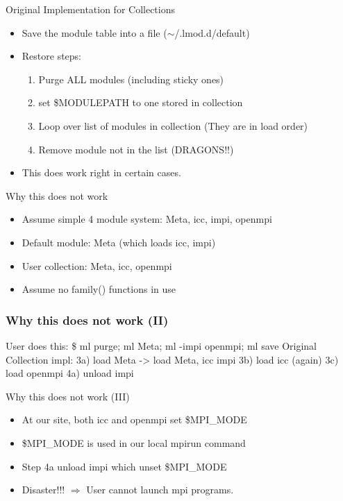 \documentclass{beamer}
\begin{document}
\begin{frame}{Original Implementation for Collections}
  \begin{itemize}
    \item Save the module table into a file ($\sim$/.lmod.d/default)
    \item Restore steps:
      \begin{enumerate}
        \item Purge ALL modules (including sticky ones)
        \item set \$MODULEPATH to one stored in collection
        \item Loop over list of modules in collection (They are in
          load order)
        \item Remove module not in the list {\color{red} (DRAGONS!!)}
      \end{enumerate}
    \item This does work right in certain cases.
  \end{itemize}
\end{frame}

\begin{frame}{Why this does not work}
  \begin{itemize}
    \item Assume simple 4 module system: Meta, icc, impi, openmpi
    \item Default module: Meta (which loads icc, impi)
    \item User collection: Meta, icc, openmpi
    \item Assume no family() functions in use
  \end{itemize}
\end{frame}

\begin{frame}[fragile]
  \frametitle{Why this does not work (II)}
    {\small
\begin{semiverbatim}
User does this:
   \$ ml purge; ml Meta; ml -impi openmpi; ml save
Original Collection impl:
   3a) load Meta -> load Meta, icc impi
   3b) load icc (again)
   3c) load openmpi
   4a) unload impi
\end{semiverbatim}
    }
\end{frame}

\begin{frame}{Why this does not work (III)}
  \begin{itemize}
    \item At our site, both icc and openmpi set \$MPI\_MODE
    \item \$MPI\_MODE is used in our local mpirun command
    \item Step 4a unload impi which unset \$MPI\_MODE
    \item Disaster!!! $\Rightarrow$ User cannot launch mpi programs.
  \end{itemize}
\end{frame}
\end{document}
